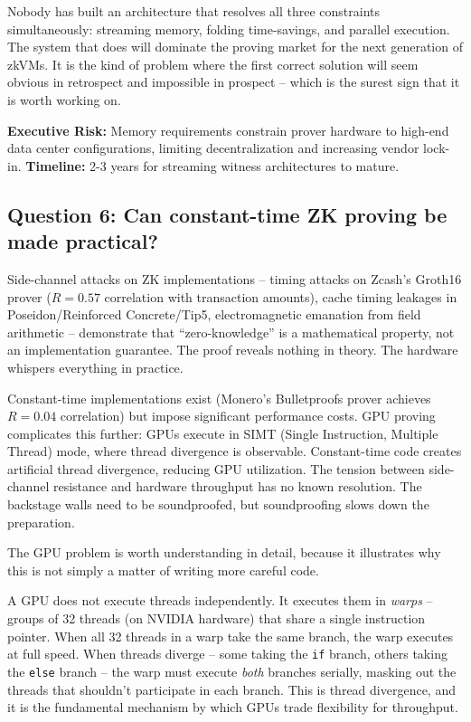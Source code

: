 \documentclass[
  11pt,
  openany]{report}
\renewcommand{\textbf}[1]{{\bfseries\color{MidnightBold}#1}}
\begin{document}
Nobody has built an architecture that resolves all three constraints
simultaneously: streaming memory, folding time-savings, and parallel execution.
The system that does will dominate the proving market for the next generation of
zkVMs. It is the kind of problem where the first correct solution will seem
obvious in retrospect and impossible in prospect -- which is the surest sign
that it is worth working on.

\textbf{Executive Risk:} Memory requirements constrain prover hardware to
high-end data center configurations, limiting decentralization and increasing
vendor lock-in. \textbf{Timeline:} 2-3 years for streaming witness architectures
to mature.

\subsection{Question 6: Can constant-time ZK proving be made
practical?}\label{question-6-can-constant-time-zk-proving-be-made-practical}

Side-channel attacks on ZK implementations -- timing attacks on Zcash's Groth16
prover (\(R = 0.57\) correlation with transaction amounts), cache timing
leakages in Poseidon/Reinforced Concrete/Tip5, electromagnetic emanation from
field arithmetic -- demonstrate that ``zero-knowledge'' is a mathematical
property, not an implementation guarantee. The proof reveals nothing in theory.
The hardware whispers everything in practice.

Constant-time implementations exist (Monero's Bulletproofs prover achieves
\(R = 0.04\) correlation) but impose significant performance costs. GPU proving
complicates this further: GPUs execute in SIMT (Single Instruction, Multiple
Thread) mode, where thread divergence is observable. Constant-time code creates
artificial thread divergence, reducing GPU utilization. The tension between
side-channel resistance and hardware throughput has no known resolution. The
backstage walls need to be soundproofed, but soundproofing slows down the
preparation.

The GPU problem is worth understanding in detail, because it illustrates why
this is not simply a matter of writing more careful code.

A GPU does not execute threads independently. It executes them in \emph{warps}
-- groups of 32 threads (on NVIDIA hardware) that share a single instruction
pointer. When all 32 threads in a warp take the same branch, the warp executes
at full speed. When threads diverge -- some taking the \texttt{if} branch,
others taking the \texttt{else} branch -- the warp must execute \emph{both}
branches serially, masking out the threads that shouldn't participate in each
branch. This is thread divergence, and it is the fundamental mechanism by which
GPUs trade flexibility for throughput.
\end{document}
